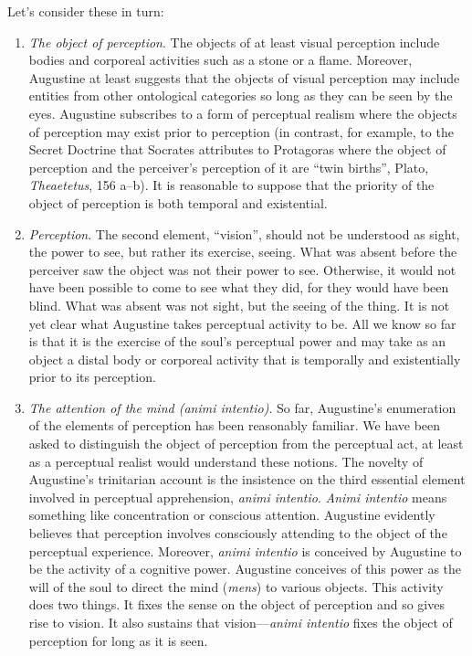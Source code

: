 \documentclass[12pt]{article}
\begin{document}
Let's consider these in turn:
\begin{enumerate}[(1)]
	\item \emph{The object of perception}. The objects of at least visual perception include bodies and corporeal activities such as a stone or a flame. Moreover, Augustine at least suggests that the objects of visual perception may include entities from other ontological categories so long as they can be seen by the eyes. Augustine subscribes to a form of perceptual realism where the objects of perception may exist prior to perception (in contrast, for example, to the Secret Doctrine that Socrates attributes to Protagoras where the object of perception and the perceiver's perception of it are ``twin births'', Plato, \emph{Theaetetus}, 156 a--b). It is reasonable to suppose that the priority of the object of perception is both temporal and existential.
	\item \emph{Perception}. The second element, ``vision'', should not be understood as sight, the power to see, but rather its exercise, seeing. What was absent before the perceiver saw the object was not their power to see. Otherwise, it would not have been possible to come to see what they did, for they would have been blind. What was absent was not sight, but the seeing of the thing. It is not yet clear what Augustine takes perceptual activity to be. All we know so far is that it is the exercise of the soul's perceptual power and may take as an object a distal body or corporeal activity that is temporally and existentially prior to its perception.
	\item \emph{The attention of the mind (\emph{animi intentio})}. So far, Augustine's enumeration of the elements of perception has been reasonably familiar. We have been asked to distinguish the object of perception from the perceptual act, at least as a perceptual realist would understand these notions. The novelty of Augustine's trinitarian account is the insistence on the third essential element involved in perceptual apprehension, \emph{animi intentio}. \emph{Animi intentio} means something like concentration or conscious attention. Augustine evidently believes that perception involves consciously attending to the object of the perceptual experience. Moreover, \emph{animi intentio} is conceived by Augustine to be the activity of a cognitive power. Augustine conceives of this power as the will of the soul to direct the mind (\emph{mens}) to various objects. This activity does two things. It fixes the sense on the object of perception and so gives rise to vision. It also sustains that vision---\emph{animi intentio} fixes the object of perception for long as it is seen.
\end{enumerate}
\end{document}

